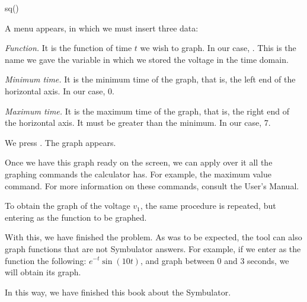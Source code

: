\begin{entry}
sq\plot()
\end{entry}

A menu appears, in which we must insert three data:

\emph{Function.} It is the function of time $t$ we wish to graph. In
our case, . This is the name we gave the variable in which
we stored the voltage in the time domain.

\emph{Minimum time.} It is the minimum time of the graph, that is,
the left end of the horizontal axis. In our case, 0.

\emph{Maximum time.} It is the maximum time of the graph, that is,
the right end of the horizontal axis. It must be greater than the
minimum. In our case, 7.

We press . The graph appears.

Once we have this graph ready on the screen, we can apply over it
all the graphing commands the calculator has. For example, the
maximum value command. For more information on these commands,
consult the User's Manual.

To obtain the graph of the voltage $v_1$, the same procedure is
repeated, but entering  as the function to be graphed.

With this, we have finished the problem. As was to be expected, the
 tool can also graph functions that are not Symbulator
answers. For example, if we enter as the function the following:
$e^{-t}\sin(10t)$, and graph between 0 and 3 seconds, we will obtain
its graph.

In this way, we have finished this book about the Symbulator.
